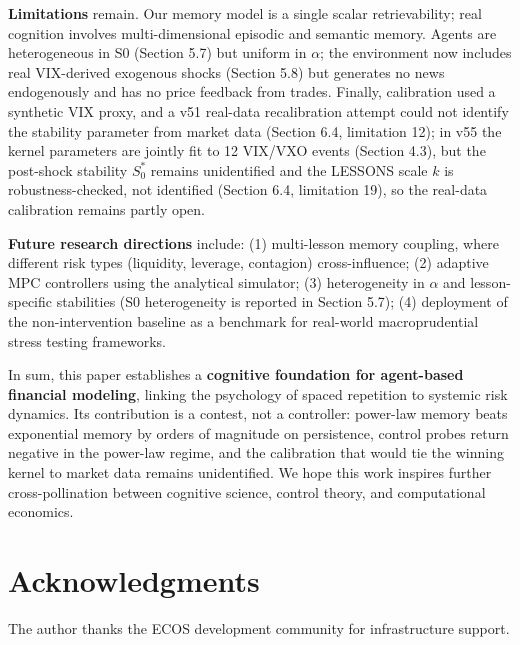 \documentclass[11pt]{article}
\begin{document}
\textbf{Limitations} remain. Our memory model is a single scalar retrievability; real cognition involves multi-dimensional episodic and semantic memory. Agents are heterogeneous in S0 (Section 5.7) but uniform in $\alpha$; the environment now includes real VIX-derived exogenous shocks (Section 5.8) but generates no news endogenously and has no price feedback from trades. Finally, calibration used a synthetic VIX proxy, and a v51 real-data recalibration attempt could not identify the stability parameter from market data (Section 6.4, limitation 12); in v55 the kernel parameters are jointly fit to 12 VIX/VXO events (Section 4.3), but the post-shock stability $S_0^*$ remains unidentified and the LESSONS scale $k$ is robustness-checked, not identified (Section 6.4, limitation 19), so the real-data calibration remains partly open.

\textbf{Future research directions} include: (1) multi-lesson memory coupling, where different risk types (liquidity, leverage, contagion) cross-influence; (2) adaptive MPC controllers using the analytical simulator; (3) heterogeneity in $\alpha$ and lesson-specific stabilities (S0 heterogeneity is reported in Section 5.7); (4) deployment of the non-intervention baseline as a benchmark for real-world macroprudential stress testing frameworks.

In sum, this paper establishes a \textbf{cognitive foundation for agent-based financial modeling}, linking the psychology of spaced repetition to systemic risk dynamics. Its contribution is a contest, not a controller: power-law memory beats exponential memory by orders of magnitude on persistence, control probes return negative in the power-law regime, and the calibration that would tie the winning kernel to market data remains unidentified. We hope this work inspires further cross-pollination between cognitive science, control theory, and computational economics.

\section*{Acknowledgments}
The author thanks the ECOS development community for infrastructure support.

\appendix
\end{document}
